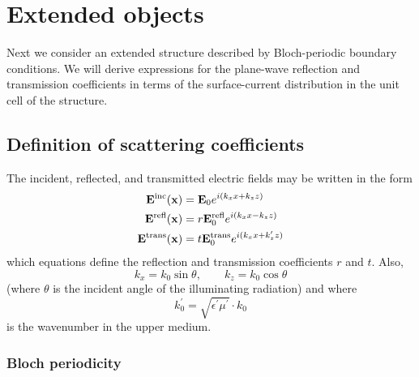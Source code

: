 \documentclass[letterpaper]{article}
\begin{document}
\section{Extended objects}

Next we consider an extended structure described by Bloch-periodic
boundary conditions. We will derive expressions for the 
plane-wave reflection and transmission coefficients in terms
of the surface-current distribution in the unit cell of the structure.

\subsection*{Definition of scattering coefficients}

The incident, reflected, and transmitted electric fields 
may be written in the form
\begin{subequations}
\begin{align}
  \mathbf{E}^{\hbox{\scriptsize{inc}}}(\mathbf{x})
&=\mathbf{E}_0 e^{ i (k_x x + k_z z)}
\\
   \mathbf{E}^{\hbox{\scriptsize{refl}}}(\mathbf{x})
&=r\mathbf{E}_0^{\hbox{\scriptsize{refl}}} e^{ i (k_x x - k_z z)}
\\
  \mathbf{E}^{\hbox{\scriptsize{trans}}}(\mathbf{x})
&=t\mathbf{E}_0^{\hbox{\scriptsize{trans}}} e^{ i (k_x x + k_z^\prime z)}
\end{align}
\label{trDef}
\end{subequations}
which equations define the reflection and transmission 
coefficients $r$ and $t$. Also,
$$ k_x = k_0\sin\theta, \qquad k_z=k_0\cos\theta$$
(where $\theta$ is the incident angle of the illuminating
radiation) and 
where 
$$ k_0^\prime = \sqrt{\epsilon^\prime \mu^\prime}\cdot k_0$$
is the wavenumber in the upper medium.

\subsubsection*{Bloch periodicity} 
\end{document}
